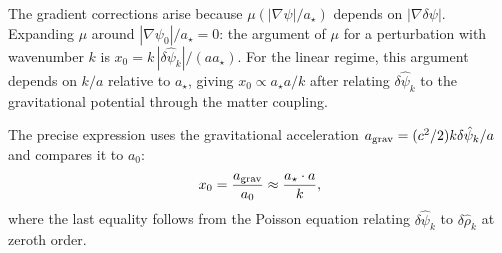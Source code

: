 \documentclass[11pt]{article}
\theoremstyle{definition}
\theoremstyle{remark}
\newcommand{\astar}{a_\star}
\begin{document}
The gradient corrections arise because $\mu(|\nabla\psi|/\astar)$ depends
on $|\nabla\delta\psi|$. Expanding $\mu$ around $|\nabla\psi_0|/\astar = 0$:
the argument of $\mu$ for a perturbation with wavenumber $k$ is
$x_0 = k\,|\delta\hat\psi_k| / (a \astar)$. For the linear regime, this
argument depends on $k/a$ relative to $\astar$, giving $x_0 \propto \astar a / k$
after relating $\delta\hat\psi_k$ to the gravitational potential through
the matter coupling.

The precise expression uses the gravitational acceleration
$a_{\rm grav} = (c^2/2) k \delta\hat\psi_k / a$ and compares it to $a_0$:
\begin{equation}
  x_0 = \frac{a_{\rm grav}}{a_0} \approx \frac{\astar \cdot a}{k},
\end{equation}
where the last equality follows from the Poisson equation relating
$\delta\hat\psi_k$ to $\delta\hat\rho_k$ at zeroth order.
\end{document}
